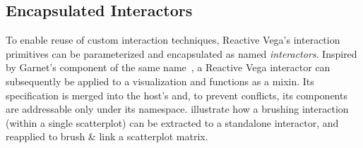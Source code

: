 \vspace{-10pt}

\subsection{Encapsulated Interactors}

\vspace{-10pt}

To enable reuse of custom interaction techniques, Reactive Vega's interaction
primitives can be parameterized and encapsulated as named \emph{interactors}.
Inspired by Garnet's component of the same name~\cite{myers:garnet}, a Reactive
Vega interactor can subsequently be applied to a visualization and functions as
a mixin. Its specification is merged into the host's and, to prevent conflicts,
its components are addressable only under its namespace.
 illustrate how a brushing interaction
(within a single scatterplot) can be extracted to a standalone interactor, and
reapplied to brush \& link a scatterplot matrix.